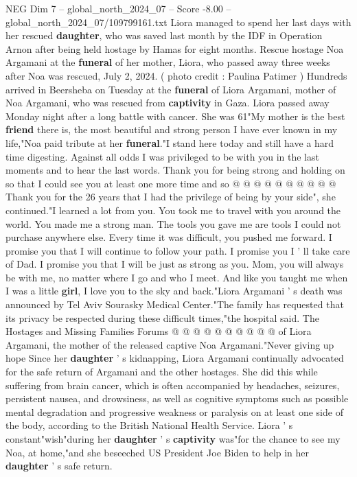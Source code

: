 \begin{textsample}{NEG Dim 7 – global\_north\_2024\_07 – Score -8.00 – global\_north\_2024\_07/109799161.txt}  \label{ex:f7_neg_116}
Liora managed to spend her last days with her rescued \textbf{daughter}, who was saved last month by the IDF in Operation Arnon after being held hostage by Hamas for eight months.
Rescue hostage Noa Argamani at the \textbf{funeral} of her mother, Liora, who passed away three weeks after Noa was rescued, July 2, 2024. ( photo credit : Paulina Patimer ) Hundreds arrived in Beersheba on Tuesday at the \textbf{funeral} of Liora Argamani, mother of Noa Argamani, who was rescued from \textbf{captivity} in Gaza.
Liora passed away Monday night after a long battle with cancer.
She was 61"My mother is the best \textbf{friend} there is, the most beautiful and strong person I have ever known in my life,"Noa paid tribute at her \textbf{funeral}."I stand here today and still have a hard time digesting.
Against all odds I was privileged to be with you in the last moments and to hear the last words.
Thank you for being strong and holding on so that I could see you at least one more time and so @ @ @ @ @ @ @ @ @ @ Thank you for the 26 years that I had the privilege of being by your side", she continued."I learned a lot from you.
You took me to travel with you around the world.
You made me a strong man.
The tools you gave me are tools I could not purchase anywhere else.
Every time it was difficult, you pushed me forward.
I promise you that I will continue to follow your path.
I promise you I ' ll take care of Dad.
I promise you that I will be just as strong as you.
Mom, you will always be with me, no matter where I go and who I meet.
And like you taught me when I was a little \textbf{girl}, I love you to the sky and back."Liora Argamani ' s death was announced by Tel Aviv Sourasky Medical Center."The family has requested that its privacy be respected during these difficult times,"the hospital said.
The Hostages and Missing Families Forums @ @ @ @ @ @ @ @ @ @ of Liora Argamani, the mother of the released captive Noa Argamani."Never giving up hope Since her \textbf{daughter} ' s kidnapping, Liora Argamani continually advocated for the safe return of Argamani and the other hostages.
She did this while suffering from brain cancer, which is often accompanied by headaches, seizures, persistent nausea, and drowsiness, as well as cognitive symptoms such as possible mental degradation and progressive weakness or paralysis on at least one side of the body, according to the British National Health Service.
Liora ' s constant"wish"during her \textbf{daughter} ' s \textbf{captivity} was"for the chance to see my Noa, at home,"and she beseeched US President Joe Biden to help in her \textbf{daughter} ' s safe return.

\end{textsample}

